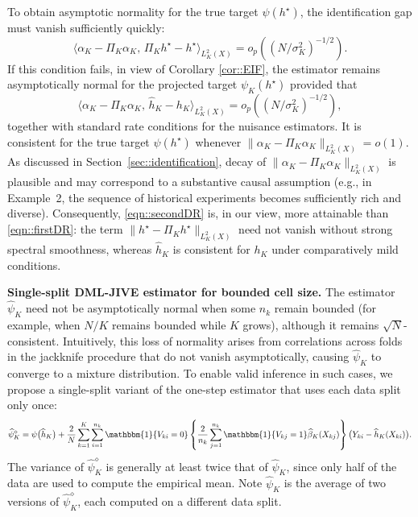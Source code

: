 \documentclass[11pt]{article}
\theoremstyle{plain}
\theoremstyle{definition}
\theoremstyle{remark}
\theoremstyle{definition}
\begin{document}
To obtain asymptotic normality for the true target $\psi(h^\star)$, the
identification gap must vanish sufficiently quickly:
\begin{equation}
\big\langle \alpha_K - \Pi_K \alpha_K,\,
      \Pi_K h^\star - h^\star \big\rangle_{L^2_K(X)}
= o_p\!\left((N/\sigma_K^2)^{-1/2}\right).
\label{eqn::firstDR}
\end{equation}
If this condition fails, in view of Corollary \ref{cor::EIF}, the estimator remains asymptotically normal for the
projected target $\psi_K(h^\star)$ provided that
\begin{equation}
    \big\langle \alpha_K - \Pi_K \alpha_K,\,
      \widehat{h}_K - h_K \big\rangle_{L^2_K(X)}
= o_p\!\left((N/\sigma_K^2)^{-1/2}\right),
\label{eqn::secondDR}
\end{equation}
together with standard rate conditions for the nuisance estimators. It is
consistent for the true target $\psi(h^\star)$ whenever
$\|\alpha_K - \Pi_K \alpha_K\|_{L^2_K(X)} = o(1)$. As discussed in
Section~\ref{sec::identification}, decay of
$\|\alpha_K - \Pi_K \alpha_K\|_{L^2_K(X)}$ is plausible and may correspond to a
substantive causal assumption (e.g., in Example~2, the sequence of historical
experiments becomes sufficiently rich and diverse). Consequently,
\eqref{eqn::secondDR} is, in our view, more attainable than
\eqref{eqn::firstDR}: the term $\|h^\star - \Pi_K h^\star\|_{L^2_K(X)}$ need not
vanish without strong spectral smoothness, whereas $\widehat{h}_K$ is consistent
for $h_K$ under comparatively mild conditions.

 
 





\medskip
 

\noindent \textbf{Single-split DML-JIVE estimator for bounded cell size.} 
The estimator $\widehat{\psi}_{K}$ need not be asymptotically normal when some $n_k$ remain bounded (for example, when $N/K$ remains bounded while $K$ grows), although it remains $\sqrt{N}$-consistent. Intuitively, this loss of normality arises from correlations across folds in the jackknife procedure that do not vanish asymptotically, causing $\widehat{\psi}_{K}$ to converge to a mixture distribution. To enable valid inference in such cases, we propose a single-split variant of the one-step estimator that uses each data split only once:
\begin{align*}
  \widehat{\psi}_{K}^{\diamond}
  = \psi\bigl(\widehat{h}_K\bigr) 
    + \frac{2}{N} \sum_{k=1}^K \sum_{i=1}^{n_k} 
      \mathbbm{1}\{V_{ki} = 0\} 
      \left\{
        \frac{2}{n_k} \sum_{j=1}^{n_k} 
        \mathbbm{1}\{V_{kj} = 1\} \widehat{\beta}_K(X_{kj})
      \right\}
      \bigl(Y_{ki} - \widehat{h}_K(X_{ki})\bigr).
\end{align*}
The variance of \( \widehat{\psi}_{K}^{\diamond} \) is generally at least twice that of \( \widehat{\psi}_K \), since only half of the data are used to compute the empirical mean. Note \( \widehat{\psi}_K \) is the average of two versions of \( \widehat{\psi}_{K}^{\diamond} \), each computed on a different data split.
 
\end{document}

